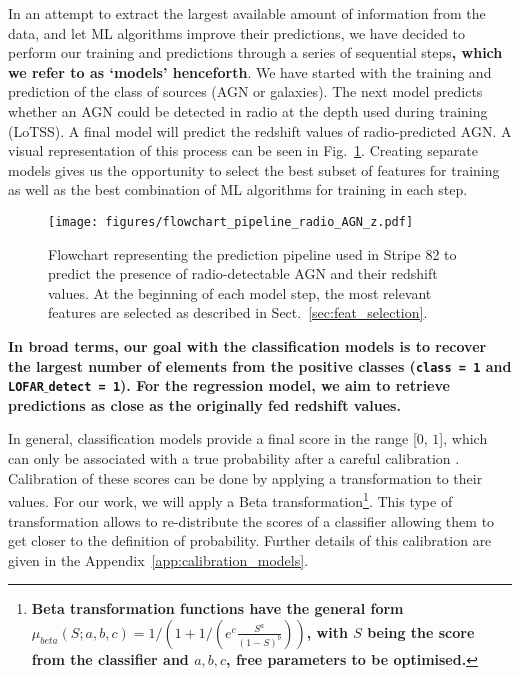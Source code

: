 \documentclass{aa}
\begin{document}
In an attempt to extract the largest available amount of information from the data, and let ML algorithms improve their predictions, we have decided to perform our training and predictions through a series of sequential steps\textbf{, which we refer to as `models' henceforth}. We have started with the training and prediction of the class of sources (AGN or galaxies). The next model predicts whether an AGN could be detected in radio at the depth used during training (LoTSS). A final model will predict the redshift values of radio-predicted AGN. A visual representation of this process can be seen in Fig.~\ref{fig:pipeline_flowchart}. Creating separate models gives us the opportunity to select the best subset of features for training as well as the best combination of ML algorithms for training in each step.

\begin{figure}
   \centering
   \texttt{[image: figures/flowchart\_pipeline\_radio\_AGN\_z.pdf]}
   \caption{Flowchart representing the prediction pipeline used in Stripe 82 to predict the presence of radio-detectable AGN and their redshift values. At the beginning of each model step, the most relevant features are selected as described in Sect.~\ref{sec:feat_selection}.}
   \label{fig:pipeline_flowchart}
\end{figure}

\textbf{In broad terms, our goal with the classification models is to recover the largest number of elements from the positive classes (\texttt{class = 1} and \texttt{LOFAR$\_$detect = 1}). For the regression model, we aim to retrieve predictions as close as the originally fed redshift values.}

In general, classification models provide a final score in the range [$0$, $1$], which can only be associated with a true probability after a careful calibration  \citep{10.1214/17-EJS1338SI, pmlr-v54-kull17a}. Calibration of these scores can be done by applying a transformation to their values. For our work, we will apply a Beta transformation\footnote{\textbf{Beta transformation functions have the general form $\mu_{beta}(S;a,b,c) = 1/\left(1 + 1 / \left(e^{c} \frac{S^{a}}{(1 - S)^{b}}\right)\right)$, with $S$ being the score from the classifier and $a,b,c$, free parameters to be optimised.}}. This type of transformation allows to re-distribute the scores of a classifier allowing them to get closer to the definition of probability. Further details of this calibration are given in the Appendix~\ref{app:calibration_models}.
\end{document}
